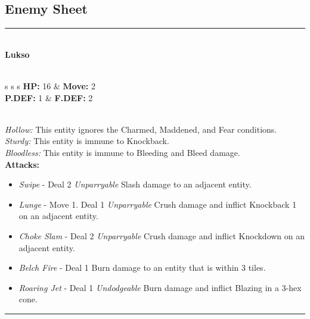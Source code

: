 \subsection*{Enemy Sheet}
\hrule
\ \\
{\large \textbf{Lukso}}\\\\
\begin{tabular}{s s s}
\textbf{HP:} 16 & \textbf{Move:} 2\\
\textbf{P.DEF:} 1 & \textbf{F.DEF:} 2 \\
\end{tabular}\\

\emph{Hollow:} This entity ignores the Charmed, Maddened, and Fear conditions.\\

\emph{Sturdy:} This entity is immune to Knockback.\\

\emph{Bloodless:} This entity is immune to Bleeding and Bleed damage.\\

\textbf{Attacks:}
\begin{itemize}
\item \emph{Swipe} -  Deal 2 \emph{Unparryable} Slash damage to an adjacent entity.
\item \emph{Lunge} - Move 1. Deal 1 \emph{Unparryable} Crush damage and inflict Knockback 1 on an adjacent entity.
\item \emph{Choke Slam} - Deal 2 \emph{Unparryable} Crush damage and inflict Knockdown on an adjacent entity.
\item \emph{Belch Fire} - Deal 1 Burn damage to an entity that is within 3 tiles.
\item \emph{Roaring Jet} - Deal 1 \emph{Undodgeable} Burn damage and inflict Blazing in a 3-hex cone.
\end{itemize}
\hrule
\ \\

\pagebreak

